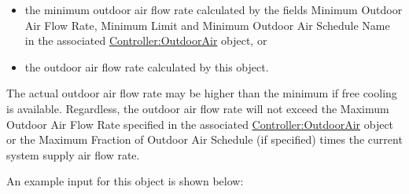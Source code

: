 \begin{itemize}
\item
  the minimum outdoor air flow rate calculated by the fields Minimum Outdoor Air Flow Rate, Minimum Limit and Minimum Outdoor Air Schedule Name in the associated \hyperref[controlleroutdoorair]{Controller:OutdoorAir} object, or
\item
  the outdoor air flow rate calculated by this object.
\end{itemize}

The actual outdoor air flow rate may be higher than the minimum if free cooling is available. Regardless, the outdoor air flow rate will not exceed the Maximum Outdoor Air Flow Rate specified in the associated \hyperref[controlleroutdoorair]{Controller:OutdoorAir} object or the Maximum Fraction of Outdoor Air Schedule (if specified) times the current system supply air flow rate.

An example input for this object is shown below:

